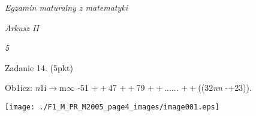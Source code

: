 \documentclass[a4paper,12pt]{article}
\begin{document}
{\it Egzamin maturalny z matematyki}

{\it Arkusz II}

{\it 5}

Zadanie 14. (5pkt)

Ob1icz: {\it n}1i$\rightarrow$m$\infty$ -51 $++$47 $++$79 $++$...... $++$((32{\it nn} -$+$23)).
\begin{center}
\texttt{[image: ./F1\_M\_PR\_M2005\_page4\_images/image001.eps]}
\end{center}
\end{document}
